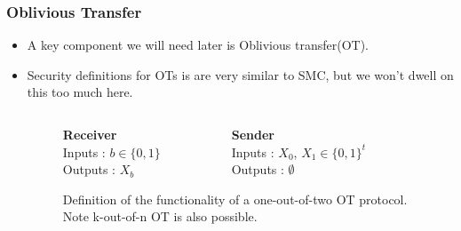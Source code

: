 \documentclass{beamer}
\begin{document}
	\begin{frame}
		\frametitle{Oblivious Transfer}
		\begin{itemize}
			\item A key component we will need later is Oblivious transfer(OT).
			\item Security definitions for OTs is are very similar to SMC, but we won't dwell on this too much here.
      
			\begin{figure}[!htb]
				\centering
				\begin{columns}
					\begin{column}{0.45\textwidth}
						\centering
						\textbf{Receiver}\\
						Inputs : $b \in \{0, 1\}$\\
						Outputs : $X_b$\\
					\end{column}

					\begin{column}{0.45\textwidth}
						\centering
						\textbf{Sender}\\
						Inputs : $X_0$, $X_1 \in \{0,1\}^t$\\
						Outputs : $\emptyset$\\
					\end{column}
				\end{columns}
				\caption{ Definition of the functionality of a one-out-of-two OT protocol. Note k-out-of-n OT is also possible.\label{fig:OTformalDef}}
			\end{figure}
		\end{itemize}
	\end{frame}
\end{document}

